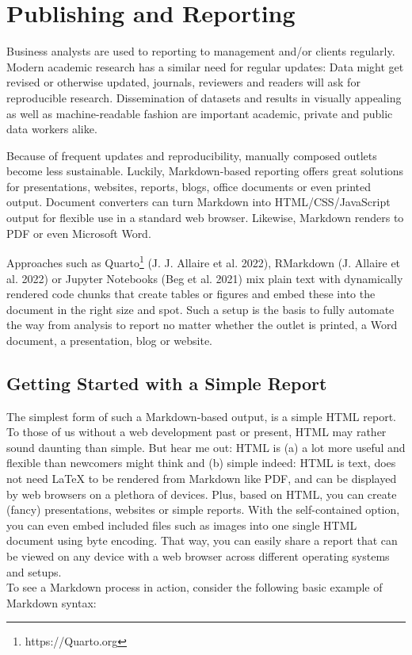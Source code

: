 \documentclass[
  12pt,
  letterpaper,
]{krantz}
\begin{document}

\hypertarget{publishing-and-reporting-1}{%
\chapter{Publishing and Reporting}\label{publishing-and-reporting-1}}

Business analysts are used to reporting to management and/or clients
regularly. Modern academic research has a similar need for regular
updates: Data might get revised or otherwise updated, journals,
reviewers and readers will ask for reproducible research. Dissemination
of datasets and results in visually appealing as well as
machine-readable fashion are important academic, private and public data
workers alike.

Because of frequent updates and reproducibility, manually composed
outlets become less sustainable. Luckily, Markdown-based reporting
offers great solutions for presentations, websites, reports, blogs,
office documents or even printed output. Document converters can turn
Markdown into HTML/CSS/JavaScript  output for flexible
use in a standard web browser. Likewise, Markdown renders to PDF or even
Microsoft Word.

Approaches such as Quarto\footnote{https://Quarto.org} (J.
J. Allaire et al. 2022), RMarkdown (J. Allaire et al.
2022) or Jupyter Notebooks (Beg et al. 2021) mix plain
text with dynamically rendered code chunks that create tables or figures
and embed these into the document in the right size and spot. Such a
setup is the basis to fully automate the way from analysis to report no
matter whether the outlet is printed, a Word document, a presentation,
blog or website.

\hypertarget{getting-started-with-a-simple-report}{%
\section{Getting Started with a Simple
Report}\label{getting-started-with-a-simple-report}}

The simplest form of such a Markdown-based output, is a simple
HTML report.\\
To those of us without a web development past or present, HTML may
rather sound daunting than simple. But hear me out: HTML is
(a) a lot more useful and flexible than newcomers might think and (b)
simple indeed: HTML is text, does not need LaTeX to be rendered from
Markdown like PDF, and can be displayed by web browsers on a plethora of
devices. Plus, based on HTML, you can create (fancy) presentations,
websites or simple reports. With the self-contained option, you can even
embed included files such as images into one single HTML document using
byte encoding. That way, you can easily share a report that can be
viewed on any device with a web browser across different operating
systems and setups.\\
To see a Markdown process in action, consider the following basic
example of Markdown syntax:
\end{document}
